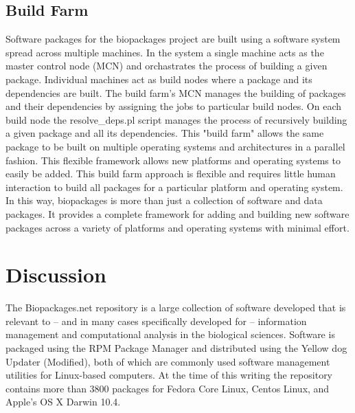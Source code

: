 

\subsection{Build Farm}

Software packages for the biopackages project are built using a software system
spread across multiple machines.  In the system a single machine acts as the
master control node (MCN) and orchastrates the process of building a given
package.  Individual machines act as build nodes where a package and its
dependencies are built.  The build farm's MCN manages the building of packages
and their dependencies by assigning the jobs to particular build nodes.  On
each build node the resolve\_deps.pl script manages the process of recursively
building a given package and all its dependencies.  This "build farm" allows
the same package to be built on multiple operating systems and architectures in
a parallel fashion.  This flexible framework allows new platforms and operating
systems to easily be added.  This build farm approach is flexible and requires
little human interaction to build all packages for a particular platform and
operating system. In this way, biopackages is more than just a collection of
software and data packages.  It provides a complete framework for adding and
building new software packages across a variety of platforms and operating
systems with minimal effort.

\section{Discussion}

The Biopackages.net repository is a large collection of software developed that
is relevant to -- and in many cases specifically developed for -- information
management and computational analysis in the biological sciences.  Software is
packaged using the RPM Package Manager and distributed using the Yellow dog
Updater (Modified), both of which are commonly used software management
utilities for Linux-based computers.  At the time of this writing the
repository contains more than 3800 packages  for Fedora Core Linux, Centos %
Linux, and Apple's OS X Darwin 10.4.

